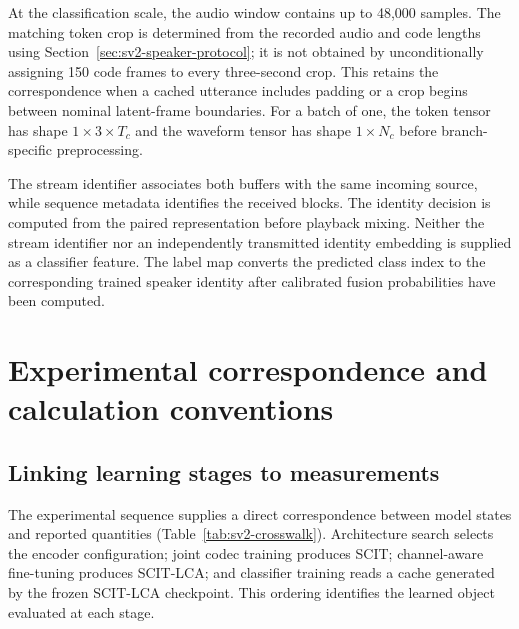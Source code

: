 At the classification scale, the audio window contains up to 48,000 samples. The matching token crop is determined from the recorded audio and code lengths using Section~\ref{sec:sv2-speaker-protocol}; it is not obtained by unconditionally assigning 150 code frames to every three-second crop. This retains the correspondence when a cached utterance includes padding or a crop begins between nominal latent-frame boundaries. For a batch of one, the token tensor has shape $1\times3\times T_c$ and the waveform tensor has shape $1\times N_c$ before branch-specific preprocessing.

The stream identifier associates both buffers with the same incoming source, while sequence metadata identifies the received blocks. The identity decision is computed from the paired representation before playback mixing. Neither the stream identifier nor an independently transmitted identity embedding is supplied as a classifier feature. The label map converts the predicted class index to the corresponding trained speaker identity after calibrated fusion probabilities have been computed.

\section{Experimental correspondence and calculation conventions}
\label{sec:sv2-correspondence}

\subsection{Linking learning stages to measurements}
The experimental sequence supplies a direct correspondence between model states and reported quantities (Table~\ref{tab:sv2-crosswalk}). Architecture search selects the encoder configuration; joint codec training produces SCIT; channel-aware fine-tuning produces SCIT-LCA; and classifier training reads a cache generated by the frozen SCIT-LCA checkpoint. This ordering identifies the learned object evaluated at each stage.

